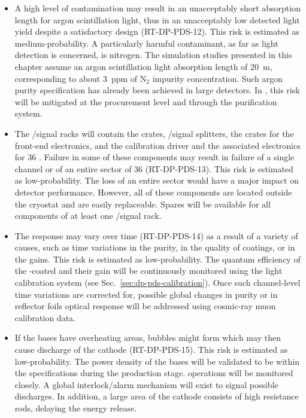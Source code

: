 \begin{itemize}

\item A high level of  contamination may result in an unacceptably short absorption length for argon scintillation light, thus in an unacceptably low detected light yield despite a satisfactory  design (RT-DP-PDS-12). This risk is estimated as medium-probability. A particularly harmful contaminant, as far as light detection is concerned, is nitrogen. The simulation studies presented in this chapter assume an argon scintillation light absorption length of \SI{20}{m}, corresponding to about \SI{3}{ppm} of N$_2$ impurity concentration. Such argon purity specification has already been achieved in large  detectors. In \dune \dual, this risk will be mitigated at the \lar procurement level and through the purification system.

\item The /signal racks will contain the  crates, /signal splitters, the  crates for the front-end electronics, and the calibration  driver and the associated electronics for \num{36} . Failure in some of these components may result in failure of a single  channel or of an entire sector of \num{36}  (RT-DP-PDS-13). This risk is estimated as low-probability. The loss of an entire  sector would have a major impact on detector performance. However, all of these components are located outside the cryostat and are easily replaceable. Spares will be available for all components of at least one /signal rack.

\item The  response may vary over time (RT-DP-PDS-14) as a result of a variety of causes, such as time variations in the  purity, in the quality of  coatings, or in the  gains. This risk is estimated as low-probability. The quantum efficiency of the -coated  and their gain will be continuously monitored using the light calibration system (see Sec.~\ref{sec:dp-pds-calibration}). Once such channel-level time variations are corrected for, possible global changes in  purity or in  reflector foils optical response will be addressed using cosmic-ray muon calibration data. 

\item If the  bases have overheating areas, bubbles might form which may then cause  discharge of the cathode (RT-DP-PDS-15). This risk is estimated as low-probability. The power density of the  bases will be validated to be within the specifications during the production stage.  operations will be monitored closely. A global interlock/alarm mechanism will exist to signal possible discharges. In addition, a large area of the cathode consists of high resistance rods, delaying the energy release.  


\end{itemize}
